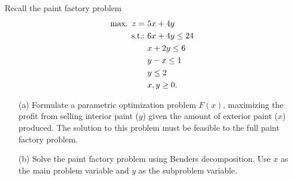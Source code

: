 Recall the paint factory problem 
%
\begin{align}
	\mathop{\text{max.~}} z = \ & 5x + 4y\\
	\mathop{\text{s.t.:~}} & 6x + 4y \leq 24\\
	& x + 2y \leq 6 \\
	& y - x \leq  1 \\
	& y \leq 2 \\
	& x, y \geq 0.
\end{align}
%

\begin{itemize} 
    \item[(a)] Formulate a parametric optimization problem $F(x)$, maximizing the profit from selling interior paint ($y$) given the amount of exterior paint ($x$) produced. The solution to this problem must be feasible to the full paint factory problem.
    \item[(b)] Solve the paint factory problem using Benders decomposition. Use $x$ as the main problem variable and $y$ as the subproblem variable.
\end{itemize}